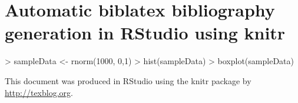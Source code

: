 \documentclass{article}
\begin{document}

 
\section*{Automatic biblatex bibliography generation in RStudio using knitr}
 
 
\begin{Schunk}
\begin{Sinput}
> sampleData <- rnorm(1000, 0,1)
> hist(sampleData)
> boxplot(sampleData)
\end{Sinput}
\end{Schunk}
 
This document was produced in RStudio using the knitr package \cite{knitr2013} by \url{http://texblog.org}.
 
\printbibliography

 
\end{document}
